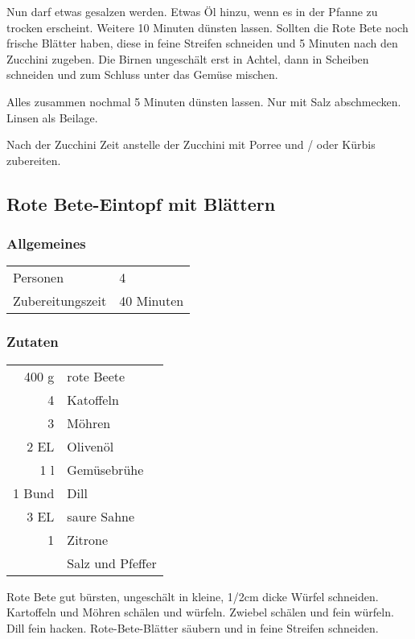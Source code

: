 Nun darf etwas gesalzen werden. Etwas Öl hinzu, wenn es in der Pfanne zu trocken erscheint. Weitere 10 Minuten dünsten lassen. Sollten die Rote Bete noch frische Blätter haben, diese in feine Streifen schneiden und 5 Minuten nach den Zucchini zugeben. Die Birnen ungeschält erst in Achtel, dann in Scheiben schneiden und zum Schluss unter das Gemüse mischen.

Alles zusammen nochmal 5 Minuten dünsten lassen. Nur mit Salz abschmecken. Linsen als Beilage.

Nach der Zucchini Zeit anstelle der Zucchini mit Porree und / oder Kürbis zubereiten.

\subsection{Rote Bete-Eintopf mit Blättern}\label{sec:RoteBete:blaetter}
\subsubsection*{Allgemeines}
\begin{tabular}{ll}
    Personen         &  4   \\
    Zubereitungszeit &  40 Minuten \\
\end{tabular} 
\subsubsection*{Zutaten}
\begin{tabular}{r l}
     400 g & rote Beete       \\
         4 & Katoffeln        \\
         3 & Möhren           \\
      2 EL & Olivenöl         \\
       1 l & Gemüsebrühe      \\
    1 Bund & Dill             \\
      3 EL & saure Sahne      \\
         1 & Zitrone          \\
           & Salz und Pfeffer
\end{tabular}

Rote Bete gut bürsten, ungeschält in kleine, 1/2cm dicke Würfel schneiden. Kartoffeln und Möhren schälen und würfeln. Zwiebel schälen und fein würfeln. Dill fein hacken. Rote-Bete-Blätter säubern und in feine Streifen schneiden.

